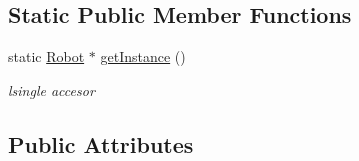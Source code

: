 \subsection*{Static Public Member Functions}
\begin{DoxyCompactItemize}
\item 
\hypertarget{classRobot_ac6f19dc31b435f8a2d43944ba49286d0}{static \hyperlink{classRobot}{Robot} $\ast$ \hyperlink{classRobot_ac6f19dc31b435f8a2d43944ba49286d0}{get\-Instance} ()}\label{classRobot_ac6f19dc31b435f8a2d43944ba49286d0}

\begin{DoxyCompactList}\small\item\em lsingle accesor \end{DoxyCompactList}\end{DoxyCompactItemize}
\subsection*{Public Attributes}
